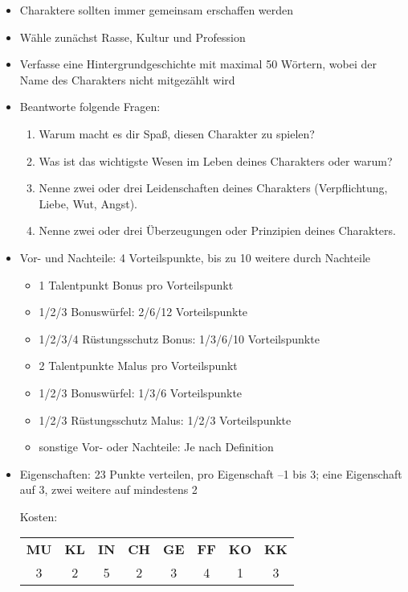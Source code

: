 \begin{itemize}
	\item Charaktere sollten immer gemeinsam erschaffen werden
	\item Wähle zunächst Rasse, Kultur und Profession
	\item Verfasse eine Hintergrundgeschichte mit maximal 50 Wörtern, wobei der Name des Charakters nicht mitgezählt wird
	\item Beantworte folgende Fragen:
	\begin{enumerate}
		\item Warum macht es dir Spaß, diesen Charakter zu spielen?
		\item Was ist das wichtigste Wesen im Leben deines Charakters oder warum?
		\item Nenne zwei oder drei Leidenschaften deines Charakters (Verpflichtung, Liebe, Wut, Angst).
		\item Nenne zwei oder drei Überzeugungen oder Prinzipien deines Charakters.
	\end{enumerate}
	\item Vor- und Nachteile: 4 Vorteilspunkte, bis zu 10 weitere durch Nachteile
	\begin{itemize}
		\item 1 Talentpunkt Bonus pro Vorteilspunkt
		\item 1/2/3 Bonuswürfel: 2/6/12 Vorteilspunkte
		\item 1/2/3/4 Rüstungsschutz Bonus: 1/3/6/10 Vorteilspunkte
		\item 2 Talentpunkte Malus pro Vorteilspunkt
		\item 1/2/3 Bonuswürfel: 1/3/6 Vorteilspunkte
		\item 1/2/3 Rüstungsschutz Malus: 1/2/3 Vorteilspunkte
		\item sonstige Vor- oder Nachteile: Je nach Definition
	\end{itemize}
	\item Eigenschaften: 23 Punkte verteilen, pro Eigenschaft --1 bis 3; eine Eigenschaft auf 3, zwei weitere auf mindestens 2

Kosten:
\begin{tabular}[C]{cccccccc}
  \bf MU\index{Mut}%
& \bf KL\index{Klugheit}%
& \bf IN\index{Intuition}%
& \bf CH\index{Charisma}%
& \bf GE\index{Gewandtheit}%
& \bf FF\index{Fingerfertigkeit}%
& \bf KO\index{Konstitution}%
& \bf KK\index{K"orperkraft}%
\\
3 & 2 & 5 & 2 & 3 & 4 & 1 & 3 \\
\end{tabular}


\end{itemize}
